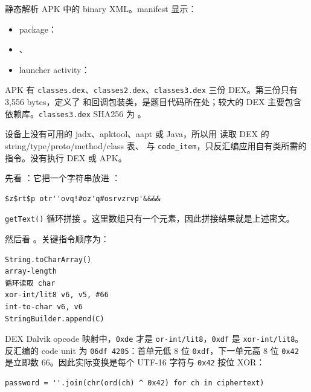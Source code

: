 \texttt{} 静态解析 APK 中的 binary XML。manifest 显示：

\begin{itemize}
\tightlist
\item
  package：\texttt{}
\item
  \texttt{}、\texttt{}
\item
  launcher activity：\texttt{}
\end{itemize}

APK 有 \texttt{classes.dex}、\texttt{classes2.dex}、\texttt{classes3.dex} 三份 DEX。第三份只有 3,556 bytes，定义了 \texttt{} 和回调包装类，是题目代码所在处；较大的 DEX 主要包含依赖库。\texttt{classes3.dex} SHA256 为 \texttt{}。

设备上没有可用的 jadx、apktool、aapt 或 Java，所以用 \texttt{} 读取 DEX 的 string/type/proto/method/class 表、\texttt{} 与 \texttt{code\_item}，只反汇编应用自有类所需的指令。没有执行 DEX 或 APK。

先看 \texttt{}：它把一个字符串放进 \texttt{}：

\begin{verbatim}
$z$rt$p otr''ovq!#oz'q#osrvzrvp'&&&&
\end{verbatim}

\texttt{getText()} 循环拼接 \texttt{}。这里数组只有一个元素，因此拼接结果就是上述密文。

然后看 \texttt{}。关键指令顺序为：

\begin{verbatim}
String.toCharArray()
array-length
循环读取 char
xor-int/lit8 v6, v5, #66
int-to-char v6, v6
StringBuilder.append(C)
\end{verbatim}

DEX Dalvik opcode 映射中，\texttt{0xde} 才是 \texttt{or-int/lit8}，\texttt{0xdf} 是 \texttt{xor-int/lit8}。反汇编的 code unit 为 \texttt{06df\ 4205}：首单元低 8 位 \texttt{0xdf}，下一单元高 8 位 \texttt{0x42} 是立即数 66。因此实际变换是每个 UTF-16 字符与 \texttt{0x42} 按位 XOR：

\begin{verbatim}
password = ''.join(chr(ord(ch) ^ 0x42) for ch in ciphertext)
\end{verbatim}

